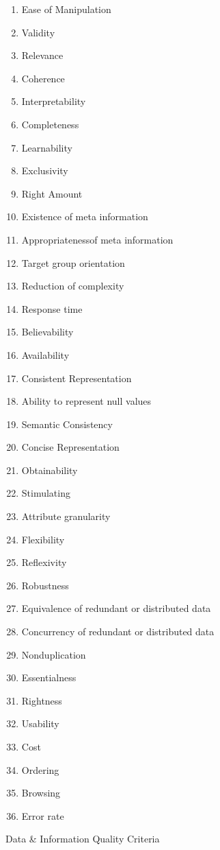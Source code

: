 \begin{figure}[htb]
\begin{multicols}{3}
\begin{enumerate}
            \item Ease of Manipulation
            \item Validity
            \item Relevance
            \item Coherence
            \item Interpretability
            \item Completeness
            \item Learnability
            \item Exclusivity
            \item Right Amount
            \item Existence of meta information
            \item Appropriateness\newline of meta information
            \item Target group orientation
            \item Reduction of complexity
            \item Response time
            \item Believability
            \item Availability
            \item Consistent Representation
            \item Ability to represent null values
            \item Semantic Consistency
            \item Concise Representation
            \item Obtainability
            \item Stimulating
            \item Attribute granularity
            \item Flexibility
            \item Reflexivity
            \item Robustness
            \item Equivalence of redundant or distributed data
            \item Concurrency of redundant or distributed data
            \item Nonduplication
            \item Essentialness
            \item Rightness
            \item Usability
            \item Cost
            \item Ordering
            \item Browsing
            \item Error rate
        \end{enumerate}
    \end{multicols}

    \centering
    \caption{Data \& Information Quality Criteria~\cite{eppler2006}}
    \label{fig:dq-criteria}
\end{figure}
\FloatBarrier

